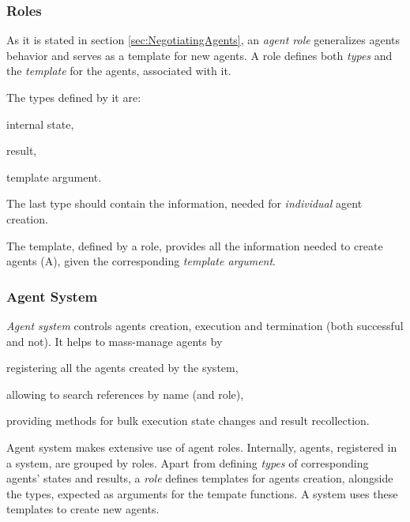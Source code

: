 \documentclass[../ThesisDoc]{subfiles}
\begin{document}
\subsubsection{Roles}

As it is stated in section \ref{sec:NegotiatingAgents}, an \emph{agent role}
generalizes agents behavior and serves as a template for new agents.
A role defines both \emph{types} and the \emph{template} for the agents, associated with it.

The types defined by it are:
  \begin{enumerate*}[1)]
    \item internal state,
    \item result,
    \item template argument.
  \end{enumerate*}
The last type should contain the information, needed for \emph{individual} agent creation.

The template, defined by a role, provides all the information needed to create agents (A),
given the corresponding \emph{template argument}.


\subsubsection{Agent System}

\emph{Agent system} controls agents creation, execution and termination
(both successful and not).
It helps to mass-manage agents by
\begin{enumerate*}[1)]
  \item registering all the agents created by the system,
  \item allowing to search references by name (and role),
  \item providing methods for bulk execution state changes and result recollection.
\end{enumerate*}


Agent system makes extensive use of agent roles. Internally, agents,
registered in a system, are grouped by roles.
Apart from defining \emph{types} of corresponding agents' states and results,
a \emph{role} defines templates for agents creation, alongside the types, expected
as arguments for the tempate functions.
A system uses these templates to create new agents.
\end{document}
